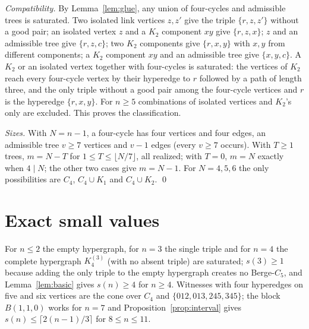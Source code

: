 \documentclass[11pt]{article}
\theoremstyle{remark}
\begin{document}
\emph{Compatibility.} By Lemma~\ref{lem:glue}, any union of four-cycles and
admissible trees is saturated. Two isolated link vertices $z,z'$ give the
triple $\{r,z,z'\}$ without a good pair; an isolated vertex $z$ and a $K_2$
component $xy$ give $\{r,z,x\}$; $z$ and an admissible tree give
$\{r,z,c\}$; two $K_2$ components give $\{r,x,y\}$ with $x,y$ from
different components; a $K_2$ component $xy$ and an admissible tree give
$\{x,y,c\}$. A $K_2$ or an isolated vertex together with four-cycles is
saturated: the vertices of $K_2$ reach every four-cycle vertex by their
hyperedge to $r$ followed by a path of length three, and the only triple
without a good pair among the four-cycle vertices and $r$ is the hyperedge
$\{r,x,y\}$. For $n\ge5$ combinations of isolated vertices and $K_2$'s only
are excluded. This proves the classification.

\emph{Sizes.} With $N=n-1$, a four-cycle has four vertices and four edges,
an admissible tree $v\ge7$ vertices and $v-1$ edges (every $v\ge7$ occurs).
With $T\ge1$ trees, $m=N-T$ for $1\le T\le\lfloor N/7\rfloor$, all realized;
with $T=0$, $m=N$ exactly when $4\mid N$; the other two cases give $m=N-1$.
For $N=4,5,6$ the only possibilities are $C_4$, $C_4\cup K_1$ and
$C_4\cup K_2$. \qed

\section{Exact small values}\label{sec:small}

For $n\le2$ the empty hypergraph, for $n=3$ the single triple and for
$n=4$ the complete hypergraph $K_4^{(3)}$ (with no absent triple) are
saturated; $s(3)\ge1$ because adding the only triple to the empty
hypergraph creates no Berge-$C_5$, and Lemma~\ref{lem:basic} gives
$s(n)\ge4$ for $n\ge4$. Witnesses with four hyperedges on five and six
vertices are the cone over $C_4$ and $\{012,013,245,345\}$; the block
$B(1,1,0)$ works for $n=7$ and Proposition~\ref{prop:interval} gives
$s(n)\le\lceil2(n-1)/3\rceil$ for $8\le n\le11$.
\end{document}
